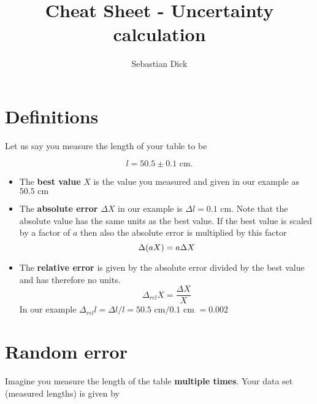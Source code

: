 \documentclass[a4paper,10pt]{article}
\title{Cheat Sheet - Uncertainty calculation}
\author{Sebastian Dick}
\begin{document}
\maketitle

\section{Definitions}

Let us say you measure the length of your table to be

\[
l = 50.5 \pm 0.1 \text{ cm.}
\]


\begin{itemize}
 \item The \textbf{best value} $X$ is the value you measured and given in our example as $50.5 \text{ cm}$
 \item The \textbf{absolute error} $\Delta X$ in our example is $ \Delta l = 0.1 \text{ cm} $. Note that the absolute value has the same units as the best value. 
 If the best value is scaled by a factor of $a$ then also the absolute error is multiplied by this factor
 \[
  \Delta(aX)= a \Delta X \\
 \]
 \item The \textbf{relative error} is given by the absolute error divided by the best value and has therefore no units.
 \[ 
  \Delta_{rel}X = \frac{\Delta X}{X}
 \]
 In our example $\Delta_{rel}l =\Delta l / l = 50.5 \text{ cm} / 0.1 \text{ cm } =  0.002$ 

\end{itemize}

\section{Random error}
Imagine you measure the length of the table \textbf{multiple times}. Your data set (measured lengths) is given by
\end{document}
